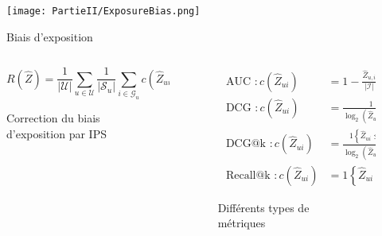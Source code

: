 \begin{frame}{\PartieII}{\Bias}

    \begin{figure}
        \centering
        \texttt{[image: PartieII/ExposureBias.png]}
        \caption{Biais d'exposition}
    \end{figure}

\end{frame}

\begin{frame}{\PartieII}{\Bias}

    \begin{columns}
        \begin{column}{0.5\textwidth}
            \begin{figure}
                \begin{equation*}
                    R(\hat{Z})=\frac{1}{|\mathcal{U}|} \sum_{u \in \mathcal{U}} \frac{1}{\left|\mathcal{S}_u\right|} \sum_{i \in \mathcal{G}_u} c\left(\hat{Z}_{u i}\right)
                \end{equation*}
                \caption{Correction du biais d'exposition par IPS}
            \end{figure}
        \end{column}

        \begin{column}{0.5\textwidth}
            \begin{figure}
                \begin{equation*}
                    \begin{aligned}
                        \text { AUC }: c\left(\hat{Z}_{u i}\right)      & =1-\frac{\hat{Z}_{u, i}}{|\mathcal{I}|}                                           \\
                        \text { DCG }: c\left(\hat{Z}_{u i}\right)      & =\frac{1}{\log _2\left(\hat{Z}_{u i}+1\right)}                                    \\
                        \text { DCG@k }: c\left(\hat{Z}_{u i}\right)    & =\frac{1\left\{\hat{Z}_{u i} \leq k\right\}}{\log _2\left(\hat{Z}_{u i}+1\right)} \\
                        \text { Recall@k }: c\left(\hat{Z}_{u i}\right) & =1\left\{\hat{Z}_{u i} \leq k\right\}
                    \end{aligned}
                \end{equation*}
                \caption{Différents types de métriques}
            \end{figure}
        \end{column}

    \end{columns}

\end{frame}


